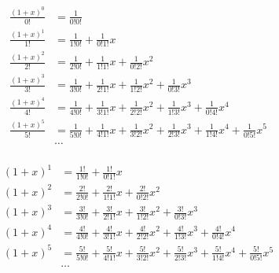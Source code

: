 \begin{equation*}
\begin{aligned}
\frac{(1 + x)^0}{0!} &=
  \frac{1}{0!0!} 
\\
\frac{(1 + x)^1}{1!} &=
  \frac{1}{1!0!} 
+ \frac{1}{0!1!} x
\\
\frac{(1 + x)^2}{2!} &= 
  \frac{1}{2!0!} 
+ \frac{1}{1!1!} x 
+ \frac{1}{0!2!} x^2
\\
\frac{(1 + x)^3}{3!} &=
  \frac{1}{3!0!} 
+ \frac{1}{2!1!} x 
+ \frac{1}{1!2!} x^2 
+ \frac{1}{0!3!} x^3
\\
\frac{(1 + x)^4}{4!} &=
  \frac{1}{4!0!} 
+ \frac{1}{3!1!} x 
+ \frac{1}{2!2!} x^2 
+ \frac{1}{1!3!} x^3 
+ \frac{1}{0!4!} x^4
\\
\frac{(1 + x)^5}{5!} &=
  \frac{1}{5!0!} 
+ \frac{1}{4!1!} x 
+ \frac{1}{3!2!} x^2 
+ \frac{1}{2!3!} x^3 
+ \frac{1}{1!4!} x^4
+ \frac{1}{0!5!} x^5
\\
&\ldots
\\
\end{aligned}
\end{equation*}

\begin{equation*}
\begin{aligned}
(1 + x)^1 &=
  \frac{1!}{1!0!} 
+ \frac{1!}{0!1!} x
\\
(1 + x)^2 &= 
  \frac{2!}{2!0!} 
+ \frac{2!}{1!1!} x 
+ \frac{2!}{0!2!} x^2
\\
(1 + x)^3 &=
  \frac{3!}{3!0!} 
+ \frac{3!}{2!1!} x 
+ \frac{3!}{1!2!} x^2 
+ \frac{3!}{0!3!} x^3
\\
(1 + x)^4 &=
  \frac{4!}{4!0!} 
+ \frac{4!}{3!1!} x 
+ \frac{4!}{2!2!} x^2 
+ \frac{4!}{1!3!} x^3 
+ \frac{4!}{0!4!} x^4
\\
(1 + x)^5 &=
  \frac{5!}{5!0!} 
+ \frac{5!}{4!1!} x 
+ \frac{5!}{3!2!} x^2 
+ \frac{5!}{2!3!} x^3 
+ \frac{5!}{1!4!} x^4
+ \frac{5!}{0!5!} x^5
\\
&\ldots
\\
\end{aligned}
\end{equation*}
